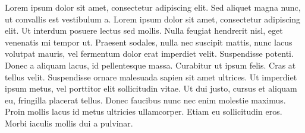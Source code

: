 Lorem ipsum dolor sit amet, consectetur adipiscing elit. Sed aliquet magna nunc, ut convallis est vestibulum a. Lorem ipsum dolor sit amet, consectetur adipiscing elit. Ut interdum posuere lectus sed mollis. Nulla feugiat hendrerit nisl, eget venenatis mi tempor ut. Praesent sodales, nulla nec suscipit mattis, nunc lacus volutpat mauris, vel fermentum dolor erat imperdiet velit. Suspendisse potenti. Donec a aliquam lacus, id pellentesque massa. Curabitur ut ipsum felis. Cras at tellus velit. Suspendisse ornare malesuada sapien sit amet ultrices. Ut imperdiet ipsum metus, vel porttitor elit sollicitudin vitae. Ut dui justo, cursus et aliquam eu, fringilla placerat tellus. Donec faucibus nunc nec enim molestie maximus. Proin mollis lacus id metus ultricies ullamcorper. Etiam eu sollicitudin eros. Morbi iaculis mollis dui a pulvinar.